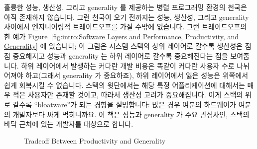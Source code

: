 훌륭한 성능, 생산성, 그리고 generality 를 제공하는 병렬 프로그래밍 환경의
천국은 아직 존재하지 않습니다.
그런 천국이 오기 전까지는 성능, 생산성, 그리고 generality 사이에서
엔지니어링적 트레이드오프를 가질 수밖에 없습니다.
그런 트레이드오프의 한 예가
Figure~\ref{fig:intro:Software Layers and Performance, Productivity, and
Generality} 에 있습니다; 이 그림은 시스템 스택의 상위 레이어로 갈수록 생산성은
점점 중요해지고 성능과 generality 는 하위 레이어로 갈수록 중요해진다는 점을
보여줍니다.
하위 레이어에서 발생하는 커다란 개발 비용은 똑같이 커다란 사용자 수로
나뉘어져야 하고(그래서 generality 가 중요하죠), 하위 레이어에서 잃은 성능은
위쪽에서 쉽게 회복시킬 수 없습니다. 
스택의 윗단에서는 해당 특정 어플리케이션에 대해서는 매우 적은 사용자만
존재할 것이고, 따라서 생산성 고려가 중요해집니다.
이게 스택의 위로 갈수록 ``bloatware''가 되는 경향을 설명합니다:
많은 경우 여분의 하드웨어가 여분의 개발자보다 싸게 먹히니까요.
이 책은 성능과 generality 가 주요 관심사인, 스택의 바닥 근처에 있는 개발자를
대상으로 합니다.

\begin{figure}[tb]
\centering
{}
\caption{Tradeoff Between Productivity and Generality}
\label{fig:intro:Tradeoff Between Productivity and Generality}
\end{figure}

